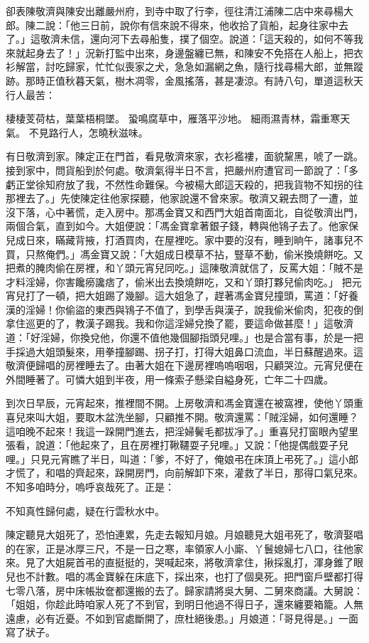 卻表陳敬濟與陳安出離嚴州府，到寺中取了行李，徑往清江浦陳二店中來尋楊大郎。陳二說：「他三日前，說你有信來說不得來，他收拾了貨船，起身往家中去了。」這敬濟未信，還向河下去尋船隻，撲了個空。說道：「這天殺的，如何不等我來就起身去了！」況新打監中出來，身邊盤纏已無，和陳安不免搭在人船上，把衣衫解當，討吃歸家，忙忙似喪家之犬，急急如漏網之魚，隨行找尋楊大郎，並無蹤跡。那時正值秋暮天氣，樹木凋零，金風搖落，甚是凄涼。有詩八句，單道這秋天行人最苦：

棲棲芰荷枯，葉葉梧桐墜。
蛩鳴腐草中，雁落平沙地。
細雨濕青林，霜重寒天氣。
不見路行人，怎曉秋滋味。

有日敬濟到家。陳定正在門首，看見敬濟來家，衣衫襤褸，面貌黧黑，唬了一跳。接到家中，問貨船到於何處。敬濟氣得半日不言，把嚴州府遭官司一節說了：「多虧正堂徐知府放了我，不然性命難保。今被楊大郎這天殺的，把我貨物不知拐的往那裡去了。」先使陳定往他家探聽，他家說還不曾來家。敬濟又親去問了一遭，並沒下落，心中著慌，走入房中。那馮金寶又和西門大姐首南面北，自從敬濟出門，兩個合氣，直到如今。大姐便說：「馮金寶拿著銀子錢，轉與他鴇子去了。他家保兒成日來，瞞藏背掖，打酒買肉，在屋裡吃。家中要的沒有，睡到晌午，諸事兒不買，只熬俺們。」馮金寶又說：「大姐成日模草不拈，豎草不動，偷米換燒餅吃。又把煮的腌肉偷在房裡，和丫頭元宵兒同吃。」這陳敬濟就信了，反罵大姐：「賊不是才料淫婦，你害饞癆讒痞了，偷米出去換燒餅吃，又和丫頭打夥兒偷肉吃。」 把元宵兒打了一頓，把大姐踢了幾腳。這大姐急了，趕著馮金寶兒撞頭，罵道：「好養漢的淫婦！你偷盜的東西與鴇子不值了，到學舌與漢子，說我偷米偷肉，犯夜的倒拿住巡更的了，教漢子踢我。我和你這淫婦兌換了罷，要這命做甚麼！」這敬濟道：「好淫婦，你換兌他，你還不值他幾個腳指頭兒哩。」也是合當有事，於是一把手採過大姐頭髮來，用拳撞腳踢、拐子打，打得大姐鼻口流血，半日蘇醒過來。這敬濟便歸唱的房裡睡去了。由著大姐在下邊房裡嗚嗚咽咽，只顧哭泣。元宵兒便在外間睡著了。可憐大姐到半夜，用一條索子懸梁自縊身死，亡年二十四歲。

到次日早辰，元宵起來，推裡間不開。上房敬濟和馮金寶還在被窩裡，使他丫頭重喜兒來叫大姐，要取木盆洗坐腳，只顧推不開。敬濟還罵：「賊淫婦，如何還睡？這咱晚不起來！我這一跺開門進去，把淫婦鬢毛都拔凈了。」重喜兒打窗眼內望里張看，說道：「他起來了，且在房裡打鞦韆耍子兒哩。」又說：「他提偶戲耍子兒哩。」只見元宵瞧了半日，叫道：「爹，不好了，俺娘弔在床頂上弔死了。」這小郎才慌了，和唱的齊起來，跺開房門，向前解卸下來，灌救了半日，那得口氣兒來。不知多咱時分，嗚呼哀哉死了。正是：

不知真性歸何處，疑在行雲秋水中。

陳定聽見大姐死了，恐怕連累，先走去報知月娘。月娘聽見大姐弔死了，敬濟娶唱的在家，正是冰厚三尺，不是一日之寒，率領家人小廝、丫鬟媳婦七八口，往他家來。見了大姐屍首弔的直挺挺的，哭喊起來，將敬濟拿住，揪採亂打，渾身錐了眼兒也不計數。唱的馮金寶躲在床底下，採出來，也打了個臭死。把門窗戶壁都打得七零八落，房中床帳妝奩都還搬的去了。歸家請將吳大舅、二舅來商議。大舅說：「姐姐，你趁此時咱家人死了不到官，到明日他過不得日子，還來纏要箱籠。人無遠慮，必有近憂。不如到官處斷開了，庶杜絕後患。」月娘道：「哥見得是。」一面寫了狀子。

